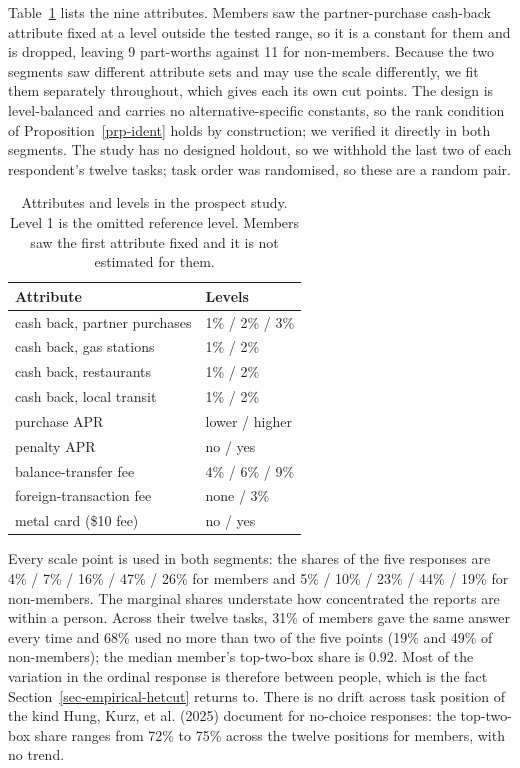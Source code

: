 \documentclass[
  letterpaper,
  DIV=11,
  numbers=noendperiod]{scrartcl}
\newcounter{none} %
\theoremstyle{plain}
\theoremstyle{plain}
\theoremstyle{plain}
\theoremstyle{remark}
\begin{document}
Table~\ref{tbl-emp-attributes} lists the nine attributes. Members saw
the partner-purchase cash-back attribute fixed at a level outside the
tested range, so it is a constant for them and is dropped, leaving 9
part-worths against 11 for non-members. Because the two segments saw
different attribute sets and may use the scale differently, we fit them
separately throughout, which gives each its own cut points. The design
is level-balanced and carries no alternative-specific constants, so the
rank condition of Proposition~\ref{prp-ident} holds by construction; we
verified it directly in both segments. The study has no designed
holdout, so we withhold the last two of each respondent's twelve tasks;
task order was randomised, so these are a random pair.

\begin{longtable}[]{@{}ll@{}}

\caption{\label{tbl-emp-attributes}Attributes and levels in the prospect
study. Level 1 is the omitted reference level. Members saw the first
attribute fixed and it is not estimated for them.}

\tabularnewline

\toprule\noalign{}
Attribute & Levels \\
\midrule\noalign{}
\endhead
\bottomrule\noalign{}
\endlastfoot
cash back, partner purchases & 1\% / 2\% / 3\% \\
cash back, gas stations & 1\% / 2\% \\
cash back, restaurants & 1\% / 2\% \\
cash back, local transit & 1\% / 2\% \\
purchase APR & lower / higher \\
penalty APR & no / yes \\
balance-transfer fee & 4\% / 6\% / 9\% \\
foreign-transaction fee & none / 3\% \\
metal card (\$10 fee) & no / yes \\

\end{longtable}

Every scale point is used in both segments: the shares of the five
responses are 4\% / 7\% / 16\% / 47\% / 26\% for members and 5\% / 10\%
/ 23\% / 44\% / 19\% for non-members. The marginal shares understate how
concentrated the reports are within a person. Across their twelve tasks,
31\% of members gave the same answer every time and 68\% used no more
than two of the five points (19\% and 49\% of non-members); the median
member's top-two-box share is 0.92. Most of the variation in the ordinal
response is therefore between people, which is the fact
Section~\ref{sec-empirical-hetcut} returns to. There is no drift across
task position of the kind Hung, Kurz, et al. (2025) document for
no-choice responses: the top-two-box share ranges from 72\% to 75\%
across the twelve positions for members, with no trend.
\end{document}
